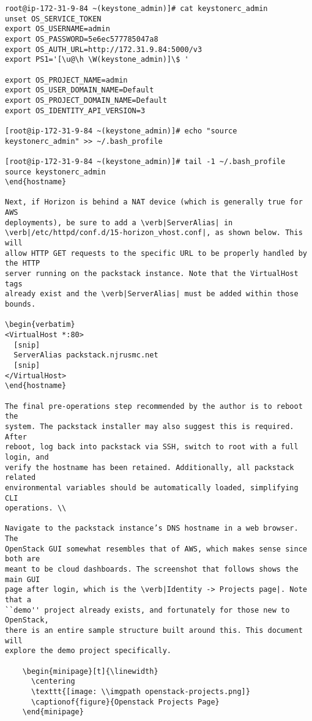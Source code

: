 \begin{verbatim}
root@ip-172-31-9-84 ~(keystone_admin)]# cat keystonerc_admin
unset OS_SERVICE_TOKEN
export OS_USERNAME=admin
export OS_PASSWORD=5e6ec577785047a8
export OS_AUTH_URL=http://172.31.9.84:5000/v3
export PS1='[\u@\h \W(keystone_admin)]\$ '

export OS_PROJECT_NAME=admin
export OS_USER_DOMAIN_NAME=Default
export OS_PROJECT_DOMAIN_NAME=Default
export OS_IDENTITY_API_VERSION=3

[root@ip-172-31-9-84 ~(keystone_admin)]# echo "source keystonerc_admin" >> ~/.bash_profile

[root@ip-172-31-9-84 ~(keystone_admin)]# tail -1 ~/.bash_profile
source keystonerc_admin
\end{hostname}

Next, if Horizon is behind a NAT device (which is generally true for AWS
deployments), be sure to add a \verb|ServerAlias| in
\verb|/etc/httpd/conf.d/15-horizon_vhost.conf|, as shown below. This will
allow HTTP GET requests to the specific URL to be properly handled by the HTTP
server running on the packstack instance. Note that the VirtualHost tags
already exist and the \verb|ServerAlias| must be added within those bounds.

\begin{verbatim}
<VirtualHost *:80>
  [snip]
  ServerAlias packstack.njrusmc.net
  [snip]
</VirtualHost>
\end{hostname}

The final pre-operations step recommended by the author is to reboot the
system. The packstack installer may also suggest this is required. After
reboot, log back into packstack via SSH, switch to root with a full login, and
verify the hostname has been retained. Additionally, all packstack related
environmental variables should be automatically loaded, simplifying CLI
operations. \\

Navigate to the packstack instance’s DNS hostname in a web browser. The
OpenStack GUI somewhat resembles that of AWS, which makes sense since both are
meant to be cloud dashboards. The screenshot that follows shows the main GUI
page after login, which is the \verb|Identity -> Projects page|. Note that a
``demo'' project already exists, and fortunately for those new to OpenStack,
there is an entire sample structure built around this. This document will
explore the demo project specifically.

    \begin{minipage}[t]{\linewidth}
	  \centering
      \texttt{[image: \\imgpath openstack-projects.png]}
      \captionof{figure}{Openstack Projects Page}
    \end{minipage}


\end{verbatim}
